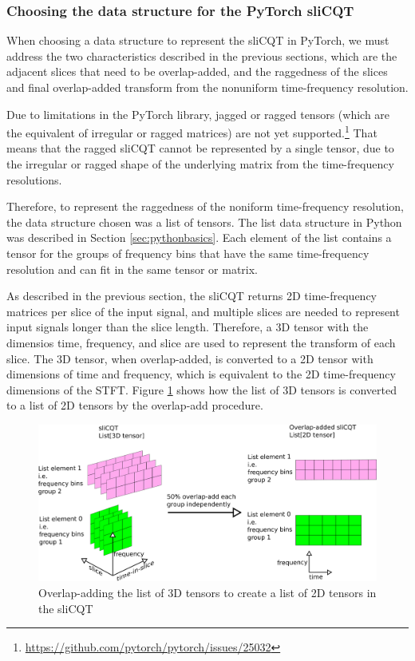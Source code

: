\documentclass[report.tex]{subfiles}
\begin{document}
\subsubsection{Choosing the data structure for the PyTorch sliCQT}
\label{sec:torchslicqdatastructure}

When choosing a data structure to represent the sliCQT in PyTorch, we must address the two characteristics described in the previous sections, which are the adjacent slices that need to be overlap-added, and the raggedness of the slices and final overlap-added transform from the nonuniform time-frequency resolution.

Due to limitations in the PyTorch library, jagged or ragged tensors (which are the equivalent of irregular or ragged matrices) are not yet supported.\footnote{\url{https://github.com/pytorch/pytorch/issues/25032}} That means that the ragged sliCQT cannot be represented by a single tensor, due to the irregular or ragged shape of the underlying matrix from the time-frequency resolutions.

Therefore, to represent the raggedness of the noniform time-frequency resolution, the data structure chosen was a list of tensors. The list data structure in Python was described in Section \ref{sec:pythonbasics}. Each element of the list contains a tensor for the groups of frequency bins that have the same time-frequency resolution and can fit in the same tensor or matrix.

As described in the previous section, the sliCQT returns 2D time-frequency matrices per slice of the input signal, and multiple slices are needed to represent input signals longer than the slice length. Therefore, a 3D tensor with the dimensios time, frequency, and slice are used to represent the transform of each slice. The 3D tensor, when overlap-added, is converted to a 2D tensor with dimensions of time and frequency, which is equivalent to the 2D time-frequency dimensions of the STFT. Figure \ref{fig:3dslicqola2d} shows how the list of 3D tensors is converted to a list of 2D tensors by the overlap-add procedure.

\begin{figure}[ht]
	\centering
	\includegraphics[width=\textwidth]{./images-blockdiagrams/3dslicqola2d.png}
	\caption{Overlap-adding the list of 3D tensors to create a list of 2D tensors in the sliCQT}
	\label{fig:3dslicqola2d}
\end{figure}
\end{document}
